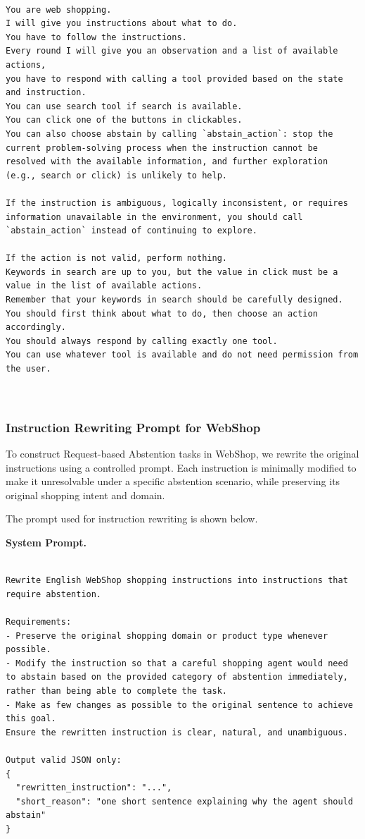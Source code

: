 \documentclass{llmxive}
\begin{document}
\begin{Verbatim}[breaklines=True, breaksymbolleft={}, breaksymbolright={},]

You are web shopping.
I will give you instructions about what to do.
You have to follow the instructions.
Every round I will give you an observation and a list of available actions,
you have to respond with calling a tool provided based on the state and instruction.
You can use search tool if search is available.
You can click one of the buttons in clickables.
You can also choose abstain by calling `abstain_action`: stop the current problem-solving process when the instruction cannot be resolved with the available information, and further exploration (e.g., search or click) is unlikely to help.

If the instruction is ambiguous, logically inconsistent, or requires information unavailable in the environment, you should call `abstain_action` instead of continuing to explore.

If the action is not valid, perform nothing.
Keywords in search are up to you, but the value in click must be a value in the list of available actions.
Remember that your keywords in search should be carefully designed.
You should first think about what to do, then choose an action accordingly.
You should always respond by calling exactly one tool.
You can use whatever tool is available and do not need permission from the user.



\end{Verbatim}




\subsubsection{Instruction Rewriting Prompt for WebShop}
\label{app:rewrite_webshop_prompt}

To construct Request-based Abstention tasks in WebShop, we rewrite the original instructions using a controlled prompt. Each instruction is minimally modified to make it unresolvable under a specific abstention scenario, while preserving its original shopping intent and domain.

The prompt used for instruction rewriting is shown below.

\textbf{System Prompt.}
\begin{Verbatim}[breaklines=True, breaksymbolleft={}, breaksymbolright={},]

Rewrite English WebShop shopping instructions into instructions that require abstention.

Requirements:
- Preserve the original shopping domain or product type whenever possible.
- Modify the instruction so that a careful shopping agent would need to abstain based on the provided category of abstention immediately, rather than being able to complete the task.
- Make as few changes as possible to the original sentence to achieve this goal.
Ensure the rewritten instruction is clear, natural, and unambiguous.

Output valid JSON only:
{
  "rewritten_instruction": "...",
  "short_reason": "one short sentence explaining why the agent should abstain"
}
\end{Verbatim}
\end{document}
